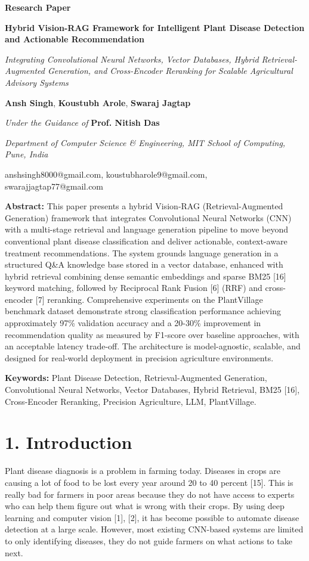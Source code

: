 \textbf{Research Paper}

\textbf{Hybrid Vision-RAG Framework for Intelligent Plant Disease
Detection and Actionable Recommendation}

\emph{Integrating Convolutional Neural Networks, Vector Databases,
Hybrid Retrieval-Augmented Generation, and Cross-Encoder Reranking for
Scalable Agricultural Advisory Systems}

\textbf{Ansh Singh}, \textbf{Koustubh Arole}, \textbf{Swaraj Jagtap}

\emph{Under the Guidance of} \textbf{Prof. Nitish Das}

\emph{Department of Computer Science \& Engineering, MIT School of
Computing, Pune, India}

anshsingh8000@gmail.com, koustubharole9@gmail.com,
swarajjagtap77@gmail.com

\textbf{Abstract:} This paper presents a hybrid Vision-RAG
(Retrieval-Augmented Generation) framework that integrates Convolutional
Neural Networks (CNN) with a multi-stage retrieval and language
generation pipeline to move beyond conventional plant disease
classification and deliver actionable, context-aware treatment
recommendations. The system grounds language generation in a structured
Q\&A knowledge base stored in a vector database, enhanced with hybrid
retrieval combining dense semantic embeddings and sparse BM25 {[}16{]}
keyword matching, followed by Reciprocal Rank Fusion {[}6{]} (RRF) and
cross-encoder {[}7{]} reranking. Comprehensive experiments on the
PlantVillage benchmark dataset demonstrate strong classification
performance achieving approximately 97\% validation accuracy and a
20-30\% improvement in recommendation quality as measured by F1-score
over baseline approaches, with an acceptable latency trade-off. The
architecture is model-agnostic, scalable, and designed for real-world
deployment in precision agriculture environments.

\textbf{Keywords:} Plant Disease Detection, Retrieval-Augmented
Generation, Convolutional Neural Networks, Vector Databases, Hybrid
Retrieval, BM25 {[}16{]}, Cross-Encoder Reranking, Precision
Agriculture, LLM, PlantVillage.

\section*{1. Introduction}\label{introduction}

Plant disease diagnosis is a problem in farming today. Diseases in crops
are causing a lot of food to be lost every year around 20 to 40 percent
{[}15{]}. This is really bad for farmers in poor areas because they do
not have access to experts who can help them figure out what is wrong
with their crops. By using deep learning and computer vision {[}1{]},
{[}2{]}, it has become possible to automate disease detection at a large
scale. However, most existing CNN-based systems are limited to only
identifying diseases, they do not guide farmers on what actions to take
next.

